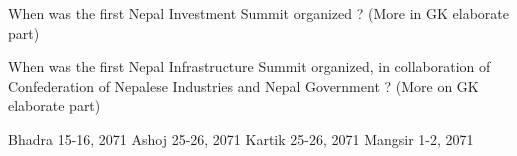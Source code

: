 \begin{questions}
\question When was the first Nepal Investment Summit organized ? (More in GK elaborate part)

\begin{choices}
\end{choices}

\question When was the first Nepal Infrastructure Summit organized, in collaboration of Confederation of Nepalese Industries and Nepal Government  ? (More on GK elaborate part)

\begin{choices}
\choice Bhadra 15-16, 2071
\choice Ashoj 25-26, 2071
\CorrectChoice Kartik 25-26, 2071
\choice Mangsir 1-2, 2071
\end{choices}

\end{questions}





